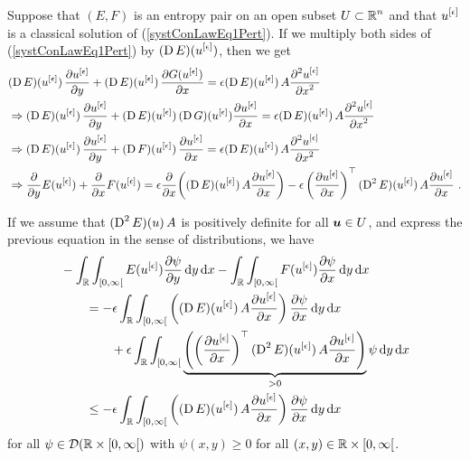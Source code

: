 Suppose that $(E,F)$ is an entropy pair on an open subset
$\DS U \subset \RR^n$
and that $\DS u^{[\epsilon]}$ is a classical solution of
(\ref{systConLawEq1Pert}).  If we multiply both sides of
(\ref{systConLawEq1Pert}) by
$\DS (\diff E)(u^{[\epsilon]})$, then we get
\begin{align*}
&(\diff E)(u^{[\epsilon]})\, \pdydx{u^{[\epsilon]}}{y}
+ (\diff E)(u^{[\epsilon]})\, \pdydx{G(u^{[\epsilon]})}{x}
= \epsilon (\diff E)(u^{[\epsilon]}) \, A \pdydxn{u^{[\epsilon]}}{x}{2} \\
&\Rightarrow
(\diff E)(u^{[\epsilon]})\, \pdydx{u^{[\epsilon]}}{y}
+ (\diff E)(u^{[\epsilon]})\, (\diff G)(u^{[\epsilon]})
\pdydx{u^{[\epsilon]}}{x} = \epsilon (\diff E)(u^{[\epsilon]}) \, A
\pdydxn{u^{[\epsilon]}}{x}{2} \\
&\Rightarrow
(\diff E)(u^{[\epsilon]})\, \pdydx{u^{[\epsilon]}}{y}
+ (\diff F)(u^{[\epsilon]})\, \pdydx{u^{[\epsilon]}}{x}
= \epsilon (\diff E)(u^{[\epsilon]}) \, A
\pdydxn{u^{[\epsilon]}}{x}{2} \\
&\Rightarrow
\pdfdx{E(u^{[\epsilon]})}{y} + \pdfdx{F(u^{[\epsilon]})}{x}
= \epsilon \pdfdx{ \left( (\diff E)(u^{[\epsilon]}) \,
A \pdydx{u^{[\epsilon]}}{x} \right) }{x}
- \epsilon \left(\pdydx{u^{[\epsilon]}}{x}\right)^\top
(\diff^2 E)(u^{[\epsilon]}) \, A \pdydx{u^{[\epsilon]}}{x} \ .
\end{align*}

If we assume that $\DS (\diff^2 E)(u) \, A$ is
positively definite for all $\VEC{u} \in U$, and
express the previous equation in the sense of distributions,
we have
\begin{equation} \label{viscSolEq1}
\begin{split}
&-\int_{\RR} \int_{[0,\infty[} E(u^{[\epsilon]}) \pdydx{\psi}{y} \dx{y}\dx{x}
- \int_{\RR} \int_{[0,\infty[} F(u^{[\epsilon]}) \pdydx{\psi}{x} \dx{y}\dx{x}
\\
&\qquad = - \epsilon \int_{\RR} \int_{[0,\infty[}
\left( (\diff E)(u^{[\epsilon]}) \,
A \pdydx{u^{[\epsilon]}}{x} \right) \pdydx{\psi}{x} \dx{y}\dx{x} \\
&\qquad\qquad + \epsilon \int_{\RR}\int_{[0,\infty[}
\underbrace{\left( \left(\pdydx{u^{[\epsilon]}}{x}\right)^\top
(\diff^2 E)(u^{[\epsilon]}) \, A \pdydx{u^{[\epsilon]}}{x}\right)}_{>0}
\psi \dx{y}\dx{x} \\
&\qquad \leq - \epsilon \int_{\RR} \int_{[0,\infty[}
\left( (\diff E)(u^{[\epsilon]}) \,
A \pdydx{u^{[\epsilon]}}{x} \right) \pdydx{\psi}{x} \dx{y}\dx{x}
\end{split}
\end{equation}
for all $\psi \in \DD(\RR\times [0,\infty[)$ with $\psi(x,y) \geq 0$
for all $(x,y) \in \RR\times [0,\infty[$.


